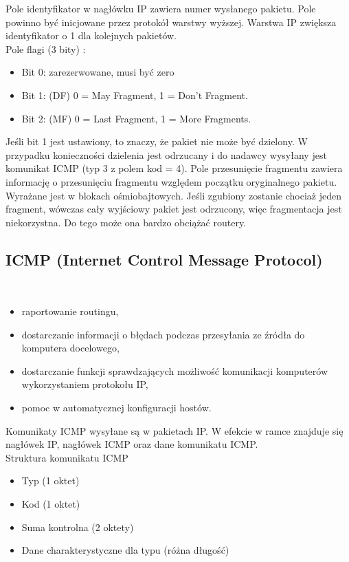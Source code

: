 \documentclass[../main.tex]{subfiles}
\begin{document}
    Pole identyfikator w nagłówku IP zawiera numer wysłanego pakietu. Pole powinno być inicjowane przez protokół warstwy wyższej. Warstwa IP zwiększa identyfikator
    o 1 dla kolejnych pakietów.\\
    Pole flagi (3 bity) :
    \begin{itemize}
        \item Bit 0: zarezerwowane, musi być zero
        \item Bit 1: (DF) 0 = May Fragment, 1 = Don't Fragment.
        \item Bit 2: (MF) 0 = Last Fragment, 1 = More Fragments.
    \end{itemize}
    Jeśli bit 1 jest ustawiony, to znaczy, że pakiet nie może być dzielony. W przypadku konieczności dzielenia jest odrzucany i do nadawcy wysyłany jest
    komunikat ICMP (typ 3 z polem kod = 4).
    Pole przesunięcie fragmentu zawiera informację o przesunięciu fragmentu względem początku oryginalnego pakietu. Wyrażane jest w blokach ośmiobajtowych.
    Jeśli zgubiony zostanie chociaż jeden fragment, wówczas cały wyjściowy pakiet jest odrzucony, więc fragmentacja jest niekorzystna.
    Do tego może ona bardzo obciążać routery.

    \subsection{ICMP (Internet Control Message Protocol)}\
\begin{itemize}
                                                             \item raportowanie routingu,
                                                             \item dostarczanie informacji o błędach podczas przesyłania ze źródła do komputera docelowego,
                                                             \item dostarczanie funkcji sprawdzających możliwość komunikacji komputerów wykorzystaniem protokołu IP,
                                                             \item pomoc w automatycznej konfiguracji hostów.
    \end{itemize}
    Komunikaty ICMP wysyłane są w pakietach IP. W efekcie w ramce znajduje się nagłówek IP, nagłówek ICMP oraz dane komunikatu ICMP.\\

    Struktura komunikatu ICMP
    \begin{itemize}
        \item Typ (1 oktet)
        \item Kod (1 oktet)
        \item Suma kontrolna (2 oktety)
        \item Dane charakterystyczne dla typu (różna długość)
    \end{itemize}
\end{document}

